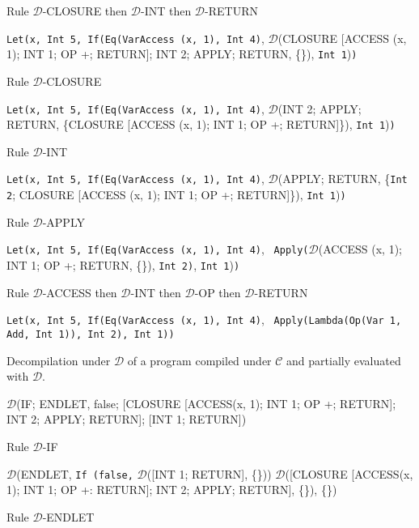 \documentclass[11pt]{article}
\begin{document}
\begin{landscape}
{\smallskip
\noindent Rule $\mathcal{D}$-CLOSURE then $\mathcal{D}$-INT then $\mathcal{D}$-RETURN
\smallskip

\noindent \texttt{Let(x, Int 5, If(Eq(VarAccess (x, 1), Int 4)}, $\mathcal{D}$(CLOSURE [ACCESS (x, 1); INT 1; OP +; RETURN]; INT 2; APPLY; RETURN, \{\}), \texttt{Int 1})\texttt{)}

\smallskip
\noindent Rule $\mathcal{D}$-CLOSURE
\smallskip

\noindent \texttt{Let(x, Int 5, If(Eq(VarAccess (x, 1), Int 4)}, $\mathcal{D}$(INT 2; APPLY; RETURN, \{CLOSURE [ACCESS (x, 1); INT 1; OP +; RETURN]\}), \texttt{Int 1})\texttt{)}

\smallskip
\noindent Rule $\mathcal{D}$-INT
\smallskip

\noindent \texttt{Let(x, Int 5, If(Eq(VarAccess (x, 1), Int 4)}, $\mathcal{D}$(APPLY; RETURN, \{\texttt{Int 2}; CLOSURE [ACCESS (x, 1); INT 1; OP +; RETURN]\}), \texttt{Int 1})\texttt{)}

\smallskip
\noindent Rule $\mathcal{D}$-APPLY
\smallskip

\noindent \texttt{Let(x, Int 5, If(Eq(VarAccess (x, 1), Int 4)}, \ \texttt{Apply(}$\mathcal{D}$(ACCESS (x, 1); INT 1; OP +; RETURN, \{\}), \texttt{Int 2)}, \texttt{Int 1})\texttt{)}

\smallskip
\noindent Rule $\mathcal{D}$-ACCESS then $\mathcal{D}$-INT then $\mathcal{D}$-OP then $\mathcal{D}$-RETURN
\smallskip

\noindent \texttt{Let(x, Int 5, If(Eq(VarAccess (x, 1), Int 4)}, \ \texttt{Apply(Lambda(Op(Var 1, Add, Int 1)), \texttt{Int 2)}, \texttt{Int 1})\texttt{)}}

}

\newpage

{\small

\noindent Decompilation under $\mathcal{D}$ of a program compiled under $\mathcal{C}$ and partially evaluated with $\mathcal{D}$.

\bigskip

\noindent $\mathcal{D}$(IF; ENDLET, {false; [CLOSURE [ACCESS(x, 1); INT 1; OP +; RETURN]; INT 2; APPLY; RETURN]; [INT 1; RETURN]})

\smallskip
\noindent Rule $\mathcal{D}$-IF
\smallskip

\noindent $\mathcal{D}$(ENDLET, \texttt{If (false,} $\mathcal{D}$([INT 1; RETURN], \{\})) $\mathcal{D}$([CLOSURE [ACCESS(x, 1); INT 1; OP +: RETURN]; INT 2; APPLY; RETURN], \{\}), \{\})

\smallskip
\noindent Rule $\mathcal{D}$-ENDLET
\smallskip

}
\end{landscape}
\end{document}
